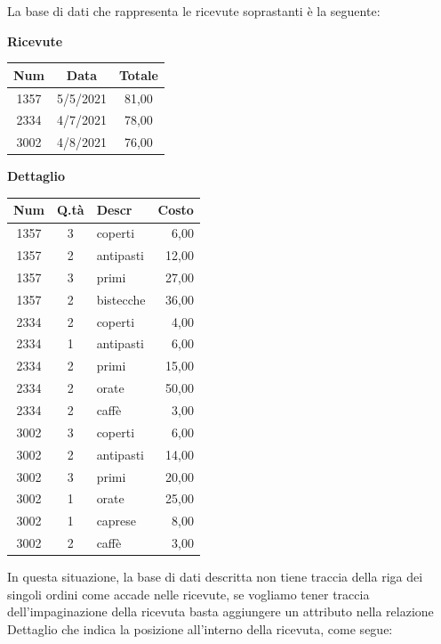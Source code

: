 \documentclass[12pt]{report}
\begin{document}
	La base di dati che rappresenta le ricevute soprastanti è la seguente:
	\begin{center}

		\textbf{Ricevute}

		\vspace{0.5cm}

		\begin{tabular}{|c|c|c|}
			\hline
			\textbf{Num} & \textbf{Data} & \textbf{Totale} \\
			\hline
			1357 & 5/5/2021 & 81,00 \\
			2334 & 4/7/2021 & 78,00 \\
			3002 & 4/8/2021 & 76,00 \\
			\hline
		\end{tabular}

		\vspace{1cm}

		\textbf{Dettaglio}

		\vspace{0.5cm}

		\begin{tabular}{|c|c|l|r|}
			\hline
			\textbf{Num} & \textbf{Q.tà} & \textbf{Descr} & \textbf{Costo} \\
			\hline
			1357 & 3 & coperti & 6,00 \\
			1357 & 2 & antipasti & 12,00 \\
			1357 & 3 & primi & 27,00 \\
			1357 & 2 & bistecche & 36,00 \\
			2334 & 2 & coperti & 4,00 \\
			2334 & 1 & antipasti & 6,00 \\
			2334 & 2 & primi & 15,00 \\
			2334 & 2 & orate & 50,00 \\
			2334 & 2 & caffè & 3,00 \\
			3002 & 3 & coperti & 6,00 \\
			3002 & 2 & antipasti & 14,00 \\
			3002 & 3 & primi & 20,00 \\
			3002 & 1 & orate & 25,00 \\
			3002 & 1 & caprese & 8,00 \\
			3002 & 2 & caffè & 3,00 \\
			\hline
		\end{tabular}

	\end{center}
	In questa situazione, la base di dati descritta non tiene traccia della riga dei singoli ordini come accade nelle ricevute, se vogliamo tener traccia dell'impaginazione della ricevuta basta aggiungere un attributo nella relazione Dettaglio che indica la posizione all'interno della ricevuta, come segue:
\end{document}
